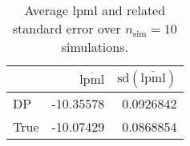 \begin{table}[H]

\caption{Average lpml and related standard error over $n_{\text{sim}} = 10$ simulations.}
\centering
\begin{tabular}[t]{lrr}
\toprule
  & $\overbar{\text{lpml}}$ & $\text{sd}(\overbar{\text{lpml}})$\\
\midrule
DP & -10.35578 & 0.0926842\\
True & -10.07429 & 0.0868854\\
\bottomrule
\end{tabular}
\end{table}